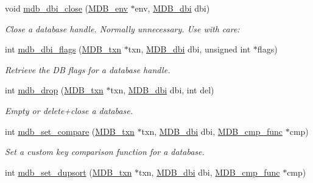 \begin{DoxyCompactItemize}
void \mbox{\hyperlink{group__internal_ga52dd98d0c542378370cd6b712ff961b5}{mdb\+\_\+dbi\+\_\+close}} (\mbox{\hyperlink{struct_m_d_b__env}{M\+D\+B\+\_\+env}} $\ast$env, \mbox{\hyperlink{group__mdb_gadbe68a06c448dfb62da16443d251a78b}{M\+D\+B\+\_\+dbi}} dbi)
\begin{DoxyCompactList}\small\item\em Close a database handle. Normally unnecessary. Use with care\+: \end{DoxyCompactList}\item 
int \mbox{\hyperlink{group__internal_ga95ba4cb721035478a8705e57b91ae4d4}{mdb\+\_\+dbi\+\_\+flags}} (\mbox{\hyperlink{struct_m_d_b__txn}{M\+D\+B\+\_\+txn}} $\ast$txn, \mbox{\hyperlink{group__mdb_gadbe68a06c448dfb62da16443d251a78b}{M\+D\+B\+\_\+dbi}} dbi, unsigned int $\ast$flags)
\begin{DoxyCompactList}\small\item\em Retrieve the DB flags for a database handle. \end{DoxyCompactList}\item 
int \mbox{\hyperlink{group__internal_gab966fab3840fc54a6571dfb32b00f2db}{mdb\+\_\+drop}} (\mbox{\hyperlink{struct_m_d_b__txn}{M\+D\+B\+\_\+txn}} $\ast$txn, \mbox{\hyperlink{group__mdb_gadbe68a06c448dfb62da16443d251a78b}{M\+D\+B\+\_\+dbi}} dbi, int del)
\begin{DoxyCompactList}\small\item\em Empty or delete+close a database. \end{DoxyCompactList}\item 
int \mbox{\hyperlink{group__internal_ga68e47ffcf72eceec553c72b1784ee0fe}{mdb\+\_\+set\+\_\+compare}} (\mbox{\hyperlink{struct_m_d_b__txn}{M\+D\+B\+\_\+txn}} $\ast$txn, \mbox{\hyperlink{group__mdb_gadbe68a06c448dfb62da16443d251a78b}{M\+D\+B\+\_\+dbi}} dbi, \mbox{\hyperlink{group__mdb_gac1ea382293d1da331ab88ca59052847d}{M\+D\+B\+\_\+cmp\+\_\+func}} $\ast$cmp)
\begin{DoxyCompactList}\small\item\em Set a custom key comparison function for a database. \end{DoxyCompactList}\item 
int \mbox{\hyperlink{group__internal_gacef4ec3dab0bbd9bc978b73c19c879ae}{mdb\+\_\+set\+\_\+dupsort}} (\mbox{\hyperlink{struct_m_d_b__txn}{M\+D\+B\+\_\+txn}} $\ast$txn, \mbox{\hyperlink{group__mdb_gadbe68a06c448dfb62da16443d251a78b}{M\+D\+B\+\_\+dbi}} dbi, \mbox{\hyperlink{group__mdb_gac1ea382293d1da331ab88ca59052847d}{M\+D\+B\+\_\+cmp\+\_\+func}} $\ast$cmp)

\end{DoxyCompactItemize}

